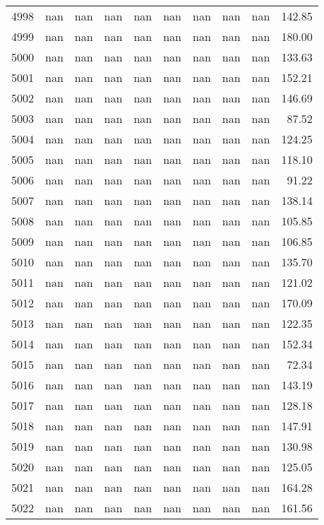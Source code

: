 \begin{tabular}{lrrrrrrrrr}
4998 & nan & nan & nan & nan & nan & nan & nan & nan & 142.85 \\
4999 & nan & nan & nan & nan & nan & nan & nan & nan & 180.00 \\
5000 & nan & nan & nan & nan & nan & nan & nan & nan & 133.63 \\
5001 & nan & nan & nan & nan & nan & nan & nan & nan & 152.21 \\
5002 & nan & nan & nan & nan & nan & nan & nan & nan & 146.69 \\
5003 & nan & nan & nan & nan & nan & nan & nan & nan & 87.52 \\
5004 & nan & nan & nan & nan & nan & nan & nan & nan & 124.25 \\
5005 & nan & nan & nan & nan & nan & nan & nan & nan & 118.10 \\
5006 & nan & nan & nan & nan & nan & nan & nan & nan & 91.22 \\
5007 & nan & nan & nan & nan & nan & nan & nan & nan & 138.14 \\
5008 & nan & nan & nan & nan & nan & nan & nan & nan & 105.85 \\
5009 & nan & nan & nan & nan & nan & nan & nan & nan & 106.85 \\
5010 & nan & nan & nan & nan & nan & nan & nan & nan & 135.70 \\
5011 & nan & nan & nan & nan & nan & nan & nan & nan & 121.02 \\
5012 & nan & nan & nan & nan & nan & nan & nan & nan & 170.09 \\
5013 & nan & nan & nan & nan & nan & nan & nan & nan & 122.35 \\
5014 & nan & nan & nan & nan & nan & nan & nan & nan & 152.34 \\
5015 & nan & nan & nan & nan & nan & nan & nan & nan & 72.34 \\
5016 & nan & nan & nan & nan & nan & nan & nan & nan & 143.19 \\
5017 & nan & nan & nan & nan & nan & nan & nan & nan & 128.18 \\
5018 & nan & nan & nan & nan & nan & nan & nan & nan & 147.91 \\
5019 & nan & nan & nan & nan & nan & nan & nan & nan & 130.98 \\
5020 & nan & nan & nan & nan & nan & nan & nan & nan & 125.05 \\
5021 & nan & nan & nan & nan & nan & nan & nan & nan & 164.28 \\
5022 & nan & nan & nan & nan & nan & nan & nan & nan & 161.56 \\

\end{tabular}
